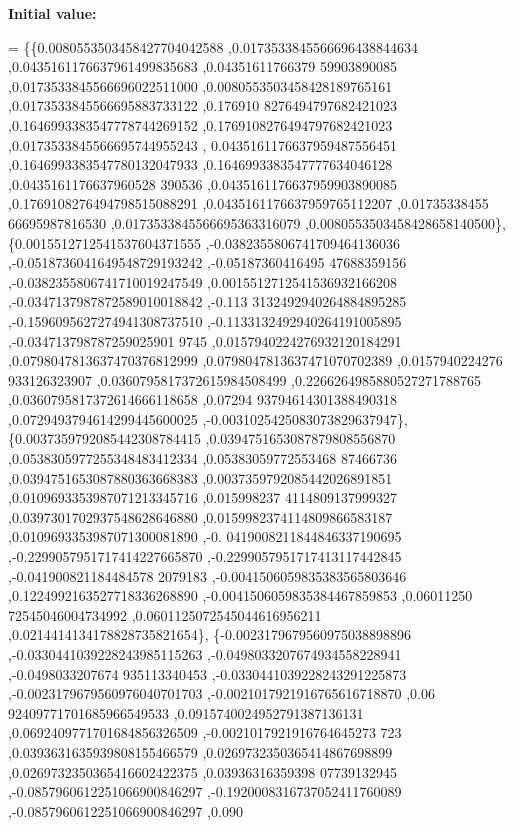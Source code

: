{\bfseries Initial value\+:}
\begin{DoxyCode}
= \{\{0.0080553503458427704042588 ,0.0173533845566696438844634 ,0.0435161176637961499835683 ,0.04351611766379
      59903890085 ,0.0173533845566696022511000 ,0.0080553503458428189765161 ,0.0173533845566695883733122 ,0.176910
      8276494797682421023 ,0.1646993383547778744269152 ,0.1769108276494797682421023 ,0.0173533845566695744955243 ,
      0.0435161176637959487556451 ,0.1646993383547780132047933 ,0.1646993383547777634046128 ,0.0435161176637960528
      390536 ,0.0435161176637959903890085 ,0.1769108276494798515088291 ,0.0435161176637959765112207 ,0.01735338455
      66695987816530 ,0.0173533845566695363316079 ,0.0080553503458428658140500\},
\{0.0015512712541537604371555 ,-0.0382355806741709464136036 ,-0.0518736041649548729193242 ,-0.05187360416495
      47688359156 ,-0.0382355806741710019247549 ,0.0015512712541536932166208 ,-0.0347137987872589010018842 ,-0.113
      3132492940264884895285 ,-0.1596095627274941308737510 ,-0.1133132492940264191005895 ,-0.034713798787259025901
      9745 ,0.0157940224276932120184291 ,0.0798047813637470376812999 ,0.0798047813637471070702389 ,0.0157940224276
      933126323907 ,0.0360795817372615984508499 ,0.2266264985880527271788765 ,0.0360795817372614666118658 ,0.07294
      93794614301388490318 ,0.0729493794614299445600025 ,-0.0031025425083073829637947\},
\{0.0037359792085442308784415 ,0.0394751653087879808556870 ,0.0538305977255348483412334 ,0.05383059772553468
      87466736 ,0.0394751653087880363668383 ,0.0037359792085442026891851 ,0.0109693353987071213345716 ,0.015998237
      4114809137999327 ,0.0397301702937548628646880 ,0.0159982374114809866583187 ,0.0109693353987071300081890 ,-0.
      0419008211844846337190695 ,-0.2299057951717414227665870 ,-0.2299057951717413117442845 ,-0.041900821184484578
      2079183 ,-0.0041506059835383565803646 ,0.1224992163527718336268890 ,-0.0041506059835384467859853 ,0.06011250
      72545046004734992 ,0.0601125072545044616956211 ,0.0214414134178828735821654\},
\{-0.0023179679560975038898896 ,-0.0330441039228243985115263 ,-0.0498033207674934558228941 ,-0.0498033207674
      935113340453 ,-0.0330441039228243291225873 ,-0.0023179679560976040701703 ,-0.0021017921916765616718870 ,0.06
      92409771701685966549533 ,0.0915740024952791387136131 ,0.0692409771701684856326509 ,-0.0021017921916764645273
      723 ,0.0393631635939808155466579 ,0.0269732350365414867698899 ,0.0269732350365416602422375 ,0.03936316359398
      07739132945 ,-0.0857960612251066900846297 ,-0.1920008316737052411760089 ,-0.0857960612251066900846297 ,0.090

\end{DoxyCode}
